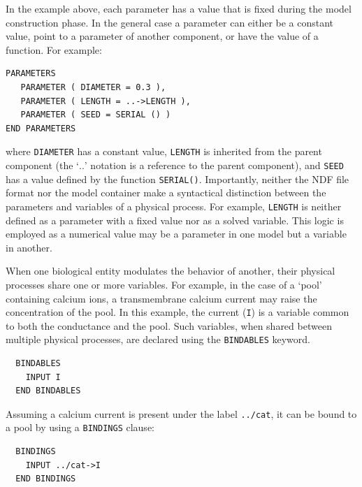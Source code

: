 \documentclass{article}
\begin{document}
In the example above, each parameter has a value that is fixed during
the model construction phase.  In the general case a parameter can
either be a constant value, point to a parameter of another component,
or have the value of a function.  For example:
\begin{verbatim}
PARAMETERS
   PARAMETER ( DIAMETER = 0.3 ),
   PARAMETER ( LENGTH = ..->LENGTH ),
   PARAMETER ( SEED = SERIAL () )
END PARAMETERS
\end{verbatim}
where {\tt DIAMETER} has a constant value, {\tt LENGTH} is inherited
from the parent component (the `$..$' notation is a reference to the
parent component), and {\tt SEED} has a value defined by the function
{\tt SERIAL()}.  Importantly, neither the NDF file format nor the
model container make a syntactical distinction between the parameters
and variables of a physical process.  For example, {\tt LENGTH} is
neither defined as a parameter with a fixed value nor as a solved
variable.  This logic is employed as a numerical value may be a
parameter in one model but a variable in another.


When one biological entity modulates the behavior of another, their
physical processes share one or more variables.  For example, in the
case of a `pool' containing calcium ions, a transmembrane calcium current may
raise the concentration of the pool. In this example, the current ({\tt I}) is a variable common to both the conductance and the pool.
Such variables, when shared between multiple physical
processes, are declared using the {\tt BINDABLES} keyword.
\begin{verbatim}
  BINDABLES
    INPUT I
  END BINDABLES
\end{verbatim}
Assuming a calcium current is present under the label {\tt ../cat},
it can be bound to a pool by using a {\tt BINDINGS}
clause:
\begin{verbatim}
  BINDINGS
    INPUT ../cat->I
  END BINDINGS
\end{verbatim}

\end{document}
